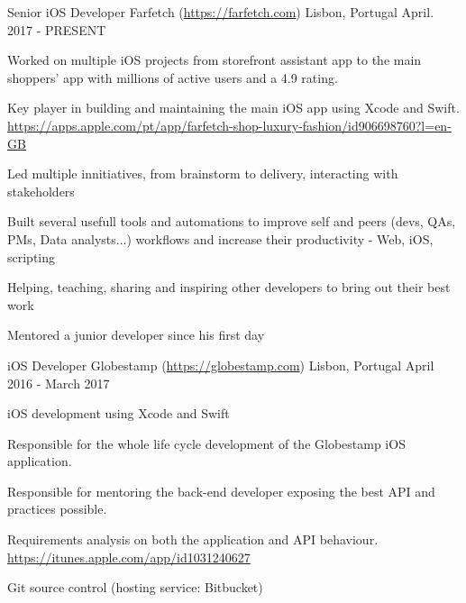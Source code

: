 

\begin{cventries}

\cventry
{Senior iOS Developer} %
{Farfetch (\url{https://farfetch.com}) } %
{Lisbon, Portugal} %
{April. 2017 - PRESENT} %
{
	\begin{cvitems} %
		\item {Worked on multiple iOS projects from storefront assistant app to the main shoppers' app with millions of active users and a 4.9 rating.}
	 	\item {Key player in building and maintaining the main iOS app using Xcode and Swift.\\}
	 	\url{https://apps.apple.com/pt/app/farfetch-shop-luxury-fashion/id906698760?l=en-GB}
	 	\item {Led multiple innitiatives, from brainstorm to delivery, interacting with stakeholders}
		\item{Built several usefull tools and automations to improve self and peers  (devs, QAs, PMs, Data analysts...) workflows and increase their productivity - Web, iOS, scripting}
		\item {Helping, teaching, sharing and inspiring other developers to bring out their best work}
		\item{Mentored a junior developer since his first day}
	\end{cvitems}
}

  \cventry
    {iOS Developer} %
    {Globestamp (\url{https://globestamp.com}) } %
    {Lisbon, Portugal} %
    {April 2016 - March 2017} %
    {
      \begin{cvitems} %
      	\item{iOS development using Xcode and Swift}
        \item {Responsible for the whole life cycle development of the Globestamp iOS application.}
        \item {Responsible for mentoring the back-end developer exposing the best API and practices possible.}
        \item {Requirements analysis on both the application and API behaviour.\\}
		\url{https://itunes.apple.com/app/id1031240627}
	 	\item {Git source control (hosting service: Bitbucket)}
      \end{cvitems}
    }


\end{cventries}

